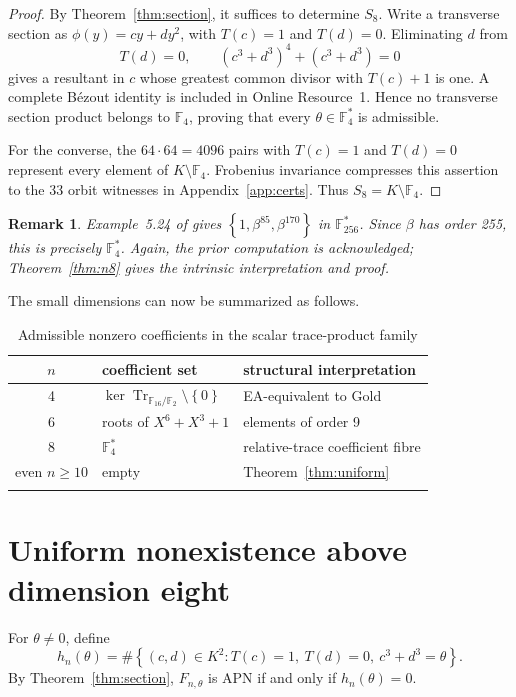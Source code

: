 \documentclass[pdflatex,sn-mathphys-num]{sn-jnl}
\theoremstyle{thmstyleone}
\theoremstyle{thmstyletwo}
\newtheorem{remark}[theorem]{Remark}
\theoremstyle{thmstylethree}
\newcommand{\F}{\mathbb F}
\newcommand{\Tr}{\operatorname{Tr}}
\newcommand{\set}[1]{\left\{#1\right\}}
\begin{document}
\begin{proof}
By Theorem~\ref{thm:section}, it suffices to determine $S_8$.  Write a transverse section as $\phi(y)=cy+dy^2$, with $T(c)=1$ and $T(d)=0$.  Eliminating $d$ from
\[
 T(d)=0,
 \qquad (c^3+d^3)^4+(c^3+d^3)=0
\]
gives a resultant in $c$ whose greatest common divisor with $T(c)+1$ is one.  A complete B\'ezout identity is included in Online Resource~1.  Hence no transverse section product belongs to $\F_4$, proving that every $\theta\in\F_4^*$ is admissible.

For the converse, the $64\cdot64=4096$ pairs with $T(c)=1$ and $T(d)=0$ represent every element of $K\setminus\F_4$.  Frobenius invariance compresses this assertion to the 33 orbit witnesses in Appendix~\ref{app:certs}.  Thus $S_8=K\setminus\F_4$.
\end{proof}

\begin{remark}\label{rem:arshad8}
Example~5.24 of \cite{Arshad2018} gives $\set{1,\beta^{85},\beta^{170}}$ in $\F_{256}^*$.  Since $\beta$ has order 255, this is precisely $\F_4^*$.  Again, the prior computation is acknowledged; Theorem~\ref{thm:n8} gives the intrinsic interpretation and proof.
\end{remark}

The small dimensions can now be summarized as follows.
\begin{table}[ht]
\caption{Admissible nonzero coefficients in the scalar trace-product family}\label{tab:ladder}
\begin{tabular*}{\textwidth}{@{\extracolsep\fill}cll}
\toprule
$n$ & coefficient set & structural interpretation\\
\midrule
4 & $\ker\Tr_{\F_{16}/\F_2}\setminus\set0$ & EA-equivalent to Gold\\
6 & roots of $X^6+X^3+1$ & elements of order 9\\
8 & $\F_4^*$ & relative-trace coefficient fibre\\
even $n\ge10$ & empty & Theorem~\ref{thm:uniform}\\
\botrule
\end{tabular*}
\end{table}

\section{Uniform nonexistence above dimension eight}\label{sec:uniform}

For $\theta\ne0$, define
\begin{equation}\label{eq:hn}
 h_n(\theta)=\#\set{(c,d)\in K^2:T(c)=1,\ T(d)=0,\ c^3+d^3=\theta}.
\end{equation}
By Theorem~\ref{thm:section}, $F_{n,\theta}$ is APN if and only if $h_n(\theta)=0$.
\end{document}

